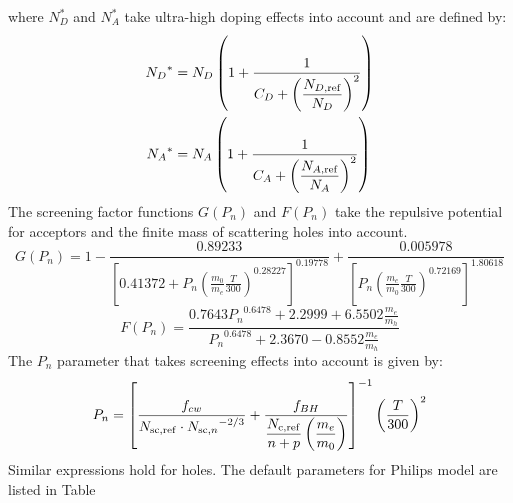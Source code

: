 \documentclass[oneside,12pt]{cgd_book}
\begin{document}
where $N_D^*$ and $N_A^*$ take ultra-high doping
          effects into account and are defined by:
\begin{subequations}
\begin{align}
 {N_D}^* &= N_D \left( 1 + \dfrac{1}{C_D + \left( \dfrac{N_{D,{\rm ref}}}{N_D} \right)^2 }
            \right)\\
 {N_A}^* &= N_A \left( 1 + \dfrac{1}{C_A + \left( \dfrac{N_{A,{\rm ref}}}{N_A } \right)^2 }
            \right)
\end{align}
\end{subequations}
The screening factor functions $G\left( P_n \right)$ and $F\left( P_n \right)$
take the repulsive potential for acceptors and the finite mass of
          scattering holes into account.
\begin{equation}
G\left( P_n \right) = 1 - \frac{0.89233}{\left[ 0.41372 + P_n \left(
            \frac{m_0}{m_e}\frac{T}{300} \right)^{0.28227} \right]^{0.19778} } + \frac{0.005978}{\left[ P_n \left(
            \frac{m_e}{m_0}\frac{T}{300} \right)^{0.72169} \right]^{1.80618}}
\end{equation}
\begin{equation}
F\left( P_n \right) = \frac{0.7643{P_n}^{0.6478} + 2.2999 + 6.5502\frac{m_e}{m_h} }
            {{P_n}^{0.6478} + 2.3670 - 0.8552\frac{m_e}{m_h} }
\end{equation}
The $P_n$ parameter that takes screening effects into account is given
          by:
\begin{equation}
P_n = \left[ {\frac{ f_{cw} }{ N_{\rm sc,ref} \cdot {N_{{\rm sc,}n}}^{-2/3} } + \dfrac{ f_{BH}
            }{ \dfrac{ N_{\rm c,ref} } {n + p}\left( \dfrac{m_e}{m_0} \right)}} \right]^{-1} \left( \frac{T}{300}
            \right)^2
\end{equation}
Similar expressions hold for holes. The default parameters for Philips model are listed in Table
\end{document}
